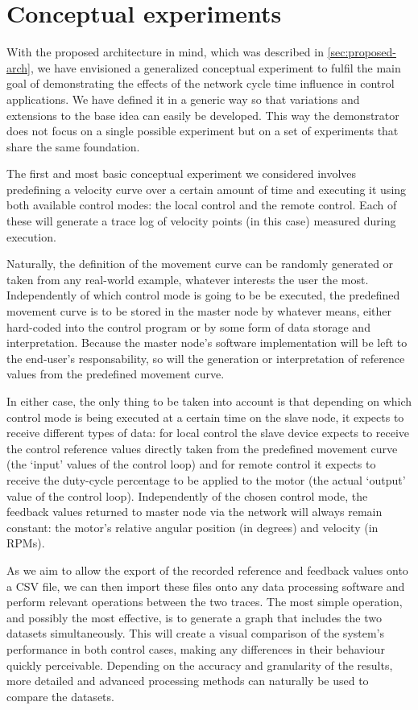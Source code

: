 \section{Conceptual experiments} \label{sec:experiments}

With the proposed architecture in mind, which was described in \autoref{sec:proposed-arch}, we have envisioned a generalized conceptual experiment to fulfil the main goal of demonstrating the effects of the network cycle time influence in control applications.
We have defined it in a generic way so that variations and extensions to the base idea can easily be developed.
This way the demonstrator does not focus on a single possible experiment but on a set of experiments that share the same foundation.

The first and most basic conceptual experiment we considered involves predefining a velocity curve over a certain amount of time and executing it using both available control modes: the local control and the remote control.
Each of these will generate a trace log of velocity points (in this case) measured during execution.

Naturally, the definition of the movement curve can be randomly generated or taken from any real-world example, whatever interests the user the most.
Independently of which control mode is going to be be executed, the predefined movement curve is to be stored in the master node by whatever means, either hard-coded into the control program or by some form of data storage and interpretation.
Because the master node's software implementation will be left to the end-user's responsability, so will the generation or interpretation of reference values from the predefined movement curve.

In either case, the only thing to be taken into account is that depending on which control mode is being executed at a certain time on the slave node, it expects to receive different types of data: for local control the slave device expects to receive the control reference values directly taken from the predefined movement curve (the `input' values of the control loop) and for remote control it expects to receive the duty-cycle percentage to be applied to the motor (the actual `output' value of the control loop).
Independently of the chosen control mode, the feedback values returned to master node via the network will always remain constant: the motor's relative angular position (in degrees) and velocity (in RPMs).

As we aim to allow the export of the recorded reference and feedback values onto a CSV file, we can then import these files onto any data processing software and perform relevant operations between the two traces.
The most simple operation, and possibly the most effective, is to generate a graph that includes the two datasets simultaneously.
This will create a visual comparison of the system's performance in both control cases, making any differences in their behaviour quickly perceivable.
Depending on the accuracy and granularity of the results, more detailed and advanced processing methods can naturally be used to compare the datasets.

